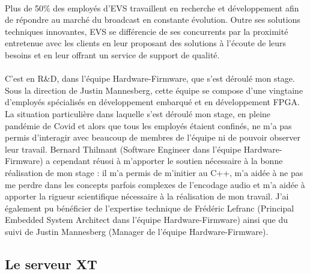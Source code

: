\documentclass{article}
\begin{document}
    \paragraph{}
    Plus de 50\% des employés d'EVS travaillent en recherche et développement afin de répondre au marché du broadcast en constante évolution. Outre ses solutions techniques innovantes, EVS se différencie de ses concurrents par la proximité entretenue avec les clients en leur proposant des solutions à l'écoute de leurs besoins et en leur offrant un service de support de qualité.

    \paragraph{}
    C'est en R\&D, dans l'équipe Hardware-Firmware, que s'est déroulé mon stage. Sous la direction de Justin Mannesberg, cette équipe se compose d'une vingtaine d'employés spécialisés en développement embarqué et en développement FPGA. La situation particulière dans laquelle s'est déroulé mon stage, en pleine pandémie de Covid et alors que tous les employés étaient confinés, ne m'a pas permis d'interagir avec beaucoup de membres de l'équipe ni de pouvoir observer leur travail. Bernard Thilmant (Software Engineer dans l'équipe Hardware-Firmware) a cependant réussi à m'apporter le soutien nécessaire à la bonne réalisation de mon stage : il m'a permis de m'initier au C++, m'a aidée à ne pas me perdre dans les concepts parfois complexes de l'encodage audio et m'a aidée à apporter la rigueur scientifique nécessaire à la réalisation de mon travail. J'ai également pu bénéficier de l'expertise technique de Frédéric Lefranc (Principal Embedded System Architect dans l'équipe Hardware-Firmware) ainsi que du suivi de Justin Mannesberg (Manager de l'équipe Hardware-Firmware).

    \subsection{Le serveur XT}
\end{document}
